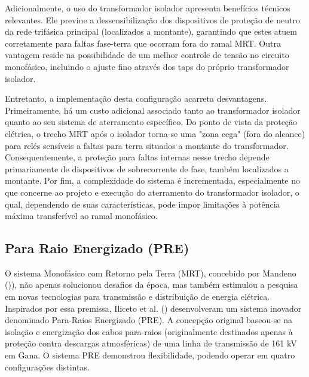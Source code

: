 \documentclass[oneside,openright,12pt]{ufsm_2021} %
\begin{document}
\par Adicionalmente, o uso do transformador isolador apresenta benefícios técnicos relevantes. Ele previne a dessensibilização dos dispositivos de proteção de neutro da rede trifásica principal (localizados a montante), garantindo que estes atuem corretamente para faltas fase-terra que ocorram fora do ramal MRT. Outra vantagem reside na possibilidade de um melhor controle de tensão no circuito monofásico, incluindo o ajuste fino através dos taps do próprio transformador isolador.

\par Entretanto, a implementação desta configuração acarreta desvantagens. Primeiramente, há um custo adicional associado tanto ao transformador isolador quanto ao seu sistema de aterramento específico. Do ponto de vista da proteção elétrica, o trecho MRT após o isolador torna-se uma "zona cega" (fora do alcance) para relés sensíveis a faltas para terra situados a montante do transformador. Consequentemente, a proteção para faltas internas nesse trecho depende primariamente de dispositivos de sobrecorrente de fase, também localizados a montante. Por fim, a complexidade do sistema é incrementada, especialmente no que concerne ao projeto e execução do aterramento do transformador isolador, o qual, dependendo de suas características, pode impor limitações à potência máxima transferível ao ramal monofásico.

\subsection{Para Raio Energizado (PRE)}

\par O sistema Monofásico com Retorno pela Terra (MRT), concebido por Mandeno ()\citeyear{mandeno_rural_1947}), não apenas solucionou desafios da época, mas também estimulou a pesquisa em novas tecnologias para transmissão e distribuição de energia elétrica. Inspirados por essa premissa, Iliceto et al. (\citeyear{iliceto_new_1989}) desenvolveram um sistema inovador denominado Para-Raios Energizado (PRE). A concepção original baseou-se na isolação e energização dos cabos para-raios (originalmente destinados apenas à proteção contra descargas atmosféricas) de uma linha de transmissão de 161 kV em Gana. O sistema PRE demonstrou flexibilidade, podendo operar em quatro configurações distintas.
\end{document}
